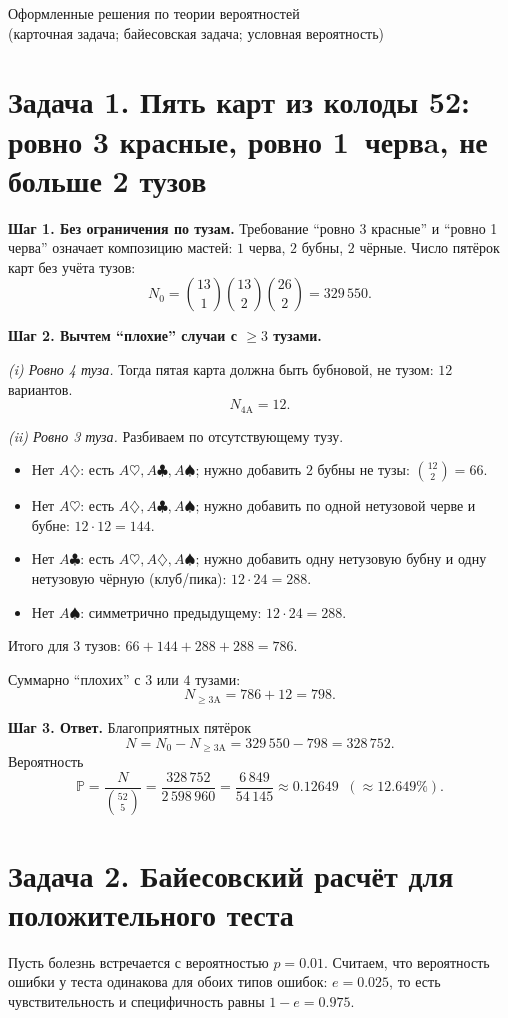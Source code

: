 \documentclass[12pt]{article}
\newcommand{\PP}{\mathbb{P}}
\newcommand{\C}[2]{\binom{#1}{#2}}
\begin{document}
\begin{center}
{\LARGE Оформленные решения по теории вероятностей}\\[4pt]
{\small (карточная задача; байесовская задача; условная вероятность)}
\end{center}

\section*{Задача 1. Пять карт из колоды 52: ровно 3 красные, ровно 1~червa, не больше 2 тузов}

\textbf{Шаг 1. Без ограничения по тузам.}
Требование ``ровно 3 красные'' и ``ровно 1 черва'' означает композицию мастей:
$1$ черва, $2$ бубны, $2$ чёрные. Число пятёрок карт без учёта тузов:
\[N_0=\C{13}{1}\C{13}{2}\C{26}{2}=329\,550.\]

\textbf{Шаг 2. Вычтем ``плохие'' случаи с $\ge 3$ тузами.}

\emph{(i) Ровно 4 туза.} Тогда пятая карта должна быть бубновой, не тузом: $12$ вариантов.
\[
N_{4\text{A}}=12.
\]

\emph{(ii) Ровно 3 туза.} Разбиваем по отсутствующему тузу.
\begin{itemize}
\item Нет $A\diamondsuit$: есть $A\heartsuit,A\clubsuit,A\spadesuit$; нужно добавить $2$ бубны не тузы: $\C{12}{2}=66$.
\item Нет $A\heartsuit$: есть $A\diamondsuit,A\clubsuit,A\spadesuit$; нужно добавить по одной нетузовой черве и бубне: $12\cdot 12=144$.
\item Нет $A\clubsuit$: есть $A\heartsuit,A\diamondsuit,A\spadesuit$; нужно добавить одну нетузовую бубну и одну нетузовую чёрную (клуб/пика): $12\cdot 24=288$.
\item Нет $A\spadesuit$: симметрично предыдущему: $12\cdot 24=288$.
\end{itemize}
Итого для $3$ тузов: $66+144+288+288=786$.

\smallskip
Суммарно ``плохих'' с $3$ или $4$ тузами: 
\[
N_{\ge3\text{A}}=786+12=798.
\]

\textbf{Шаг 3. Ответ.} Благоприятных пятёрок 
\[
N = N_0-N_{\ge3\text{A}}=329\,550-798=328\,752.
\]
Вероятность
\[
\PP=\frac{N}{\C{52}{5}}=\frac{328\,752}{2\,598\,960}
=\frac{6\,849}{54\,145}\approx 0.12649\;\;(\approx 12.649\%).
\]

\section*{Задача 2. Байесовский расчёт для положительного теста}
Пусть болезнь встречается с вероятностью $p=0.01$. Считаем, что вероятность ошибки у теста одинакова
для обоих типов ошибок: $e=0.025$, то есть чувствительность и специфичность равны $1-e=0.975$.
\end{document}

